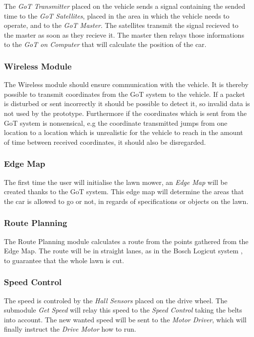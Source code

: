The \textit{GoT Transmitter} placed on the vehicle sends a signal containing the sended time to the \textit{GoT Satellites}, placed in the area in which the vehicle needs to operate, and to the \textit{GoT Master}. The satellites transmit the signal recieved to the master as soon as they recieve it. The master then relays those informations to the \textit{GoT on Computer} that will calculate the position of the car.

\subsubsection{Wireless Module}
The Wireless module should ensure communication with the vehicle. It is thereby possible to transmit coordinates from the GoT system to the vehicle. If a packet is disturbed or sent incorrectly it should be possible to detect it, so invalid data is not used by the prototype. Furthermore if the coordinates which is sent from the GoT system is nonsensical, e.g the coordinate transmitted jumps from one location to a location which is unrealistic for the vehicle to reach in the amount of time between received coordinates, it should also be disregarded.

\subsubsection{Edge Map}
The first time the user will initialise the lawn mower, an \textit{Edge Map} will be created thanks to the GoT system. This edge map will determine the areas that the car is allowed to go or not, in regards of specifications or objects on the lawn.  

\subsubsection{Route Planning}
The Route Planning module calculates a route from the points gathered from the Edge Map. The route will be in straight lanes, as in the Bosch Logicut system , to guarantee that the whole lawn is cut. 

\subsubsection{Speed Control}
The speed is controled by the \textit{Hall Sensors} placed on the drive wheel. The submodule \textit{Get Speed} will relay this speed to the \textit{Speed Control} taking the belts into account. The new wanted speed will be sent to the \textit{Motor Driver}, which will finally instruct the \textit{Drive Motor} how to run.


